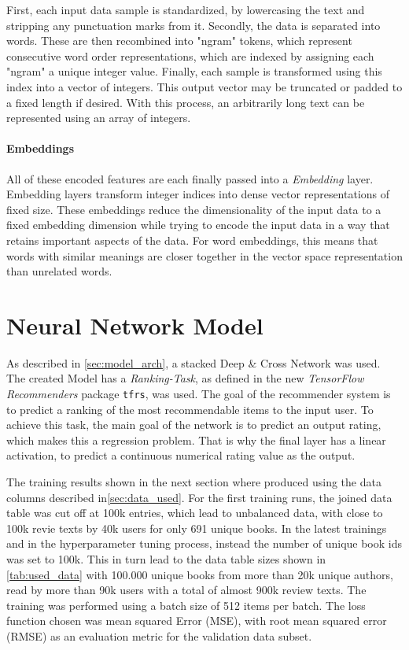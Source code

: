 \documentclass[10pt,final,journal,a4paper,oneside,twocolumn]{IEEEtran}
\begin{document}
First, each input data sample is standardized, by lowercasing the text and stripping any punctuation marks from it.
Secondly, the data is separated into words. These are then recombined into "ngram" tokens, which represent consecutive word order representations, which are indexed by assigning each "ngram" a unique integer value. Finally, each sample is transformed using this index into a vector of integers.
This output vector may be truncated or padded to a fixed length if desired.
With this process, an arbitrarily long text can be represented using an array of integers.

\paragraph{Embeddings}
All of these encoded features are each finally passed into a \emph{Embedding} layer. 
Embedding layers transform integer indices into dense vector representations of fixed size. These embeddings reduce the dimensionality of the input data to a fixed embedding dimension while trying to encode the input data in a way that retains important aspects of the data. For word embeddings, this means that words with similar meanings are closer together in the vector space representation than unrelated words.



\section{Neural Network Model}
As described in \autoref{sec:model_arch}, a stacked Deep \& Cross Network was used.
The created Model has a \emph{Ranking-Task}, as defined in the new \emph{TensorFlow Recommenders} package \texttt{tfrs}, was used. The goal of the recommender system is to predict a ranking of the most recommendable items to the input user. To achieve this task, the main goal of the network is to predict an output rating, which makes this a regression problem. That is why the final layer has a linear activation, to predict a continuous numerical rating value as the output.

The training results shown in the next section where produced using the data columns described in\autoref{sec:data_used}. For the first training runs, the joined data table was cut off at 100k entries, which lead to unbalanced data, with close to 100k revie texts by 40k users for only 691 unique books.
In the latest trainings and in the hyperparameter tuning process, instead the number of unique book ids was set to 100k. This in turn lead to the data table sizes shown in \autoref{tab:used_data} with 100.000 unique books from more than 20k unique authors, read by more than 90k users with a total of almost 900k review texts. The training was performed using a batch size of 512 items per batch. The loss function chosen was mean squared Error (MSE), with root mean squared error (RMSE) as an evaluation metric for the validation data subset.
\end{document}
